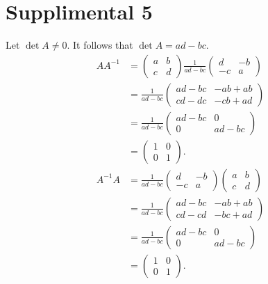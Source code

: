 \documentclass[11pt, letterpaper]{report}
\begin{document}
\section*{Supplimental 5}
Let $\det A\neq 0$. It follows that $\det A=ad-bc$.
\begin{align*}
	A A^{-1}&=\begin{pmatrix}
		a&b\\ c&d
	\end{pmatrix}
	\frac{1}{ad-bc}
	\begin{pmatrix}
		d&-b\\ -c&a
	\end{pmatrix}\\
		&=\frac{1}{ad-bc}
	\begin{pmatrix}
		ad - bc & -ab + ab\\
		cd - dc & -cb + ad
	\end{pmatrix}\\
		&= \frac{1}{ad-bc}
	\begin{pmatrix}
		ad-bc & 0\\
		0&ad-bc
	\end{pmatrix}\\
		&=
	\begin{pmatrix}
		1&0\\ 0&1
	\end{pmatrix}
.\end{align*}
\begin{align*}
	A^{-1}A&=
	\frac{1}{ad-bc}
	\begin{pmatrix}
		d&-b\\ -c&a
	\end{pmatrix}\begin{pmatrix}
		a&b\\ c&d
	\end{pmatrix}\\
		&=\frac{1}{ad-bc}
	\begin{pmatrix}
		ad - bc & -ab + ab\\
		cd - cd & -bc + ad
	\end{pmatrix}\\
		&= \frac{1}{ad-bc}
	\begin{pmatrix}
		ad-bc & 0\\
		0&ad-bc
	\end{pmatrix}\\
		&=
	\begin{pmatrix}
		1&0\\ 0&1
	\end{pmatrix}
.\end{align*}
\end{document}

